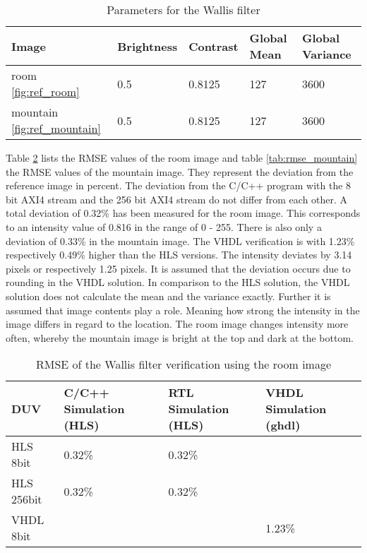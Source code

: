 \begin{table}[tb!]
    \centering
    \begin{tabular}{l l l l l}
        \toprule
        Image & Brightness & Contrast & Global Mean & Global Variance \\
        \midrule
        room \ref{fig:ref_room} & 0.5 & 0.8125 & 127 & 3600 \\
        mountain \ref{fig:ref_mountain} & 0.5 & 0.8125 & 127 & 3600 \\
        \bottomrule
    \end{tabular}
    \caption{Parameters for the Wallis filter}
    \label{tab:parameter}
\end{table}



Table \ref{tab:rmse_room} lists the RMSE values of the room image and table 
\ref{tab:rmse_mountain} the RMSE
values of the mountain image. They
represent the deviation from the reference image in percent. The deviation from
the C/C++ program with the 8 bit AXI4 stream and the 256 bit AXI4 stream do
not differ from each other. A total deviation of 0.32\% has been measured for
the
room image. This corresponds to an intensity value of 0.816 in the range of 0 -
255. There is also only a deviation of 0.33\% in the mountain image. The VHDL
verification is with 1.23\% respectively 0.49\% higher than the
HLS versions. The intensity deviates by 3.14 pixels or respectively 1.25 pixels.
It is assumed that the deviation occurs due to rounding in the VHDL solution. In
comparison to the HLS solution, the VHDL solution does not calculate the mean
and the variance exactly. Further it is assumed that image contents play a
role. Meaning how strong the intensity in the image differs in regard to the
location. The room image changes intensity more often, whereby the mountain
image is bright at the top and dark at the bottom.

\begin{table}[tb!]
    \centering
    \begin{tabular}{l l l l}
        \toprule
        DUV & C/C++ Simulation (HLS) & RTL Simulation (HLS) & VHDL Simulation (ghdl) \\
        \midrule
        HLS  8bit    & 0.32\%    & 0.32\%    & {}\\
        HLS  256bit  & 0.32\%    & 0.32\%    & {} \\
        VHDL 8bit        & {}         & {}         & 1.23\% \\
        \bottomrule
    \end{tabular}
    \caption{RMSE of the Wallis filter verification using the room image}
    \label{tab:rmse_room}
\end{table}

